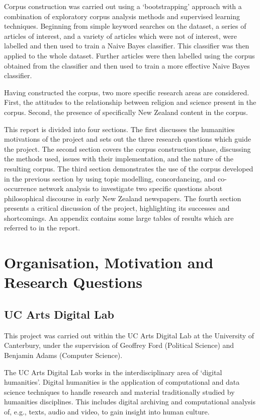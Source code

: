 \documentclass{article}
\begin{document}
Corpus construction was carried out using a `bootstrapping' approach with a combination of exploratory corpus analysis methods and supervised learning techniques. Beginning from simple keyword searches on the dataset, a series of articles of interest, and a variety of articles which were not of interest, were labelled and then used to train a Naive Bayes classifier. This classifier was then applied to the whole dataset. Further articles were then labelled using the corpus obtained from the classifier and then used to train a more effective Naive Bayes classifier.

Having constructed the corpus, two more specific research areas are considered. First, the attitudes to the relationship between religion and science present in the corpus. Second, the presence of specifically New Zealand content in the corpus.

This report is divided into four sections. The first discusses the humanities motivations of the project and sets out the three research questions which guide the project. The second section covers the corpus construction phase, discussing the methods used, issues with their implementation, and the nature of the resulting corpus. The third section demonstrates the use of the corpus developed in the previous section by using topic modelling, concordancing, and co-occurrence network analysis to investigate two specific questions about philosophical discourse in early New Zealand newspapers. The fourth section presents a critical discussion of the project, highlighting its successes and shortcomings. An appendix contains some large tables of results which are referred to in the report.

\section{Organisation, Motivation and Research Questions}

\subsection{UC Arts Digital Lab}

This project was carried out within the UC Arts Digital Lab at the University of Canterbury, under the supervision of Geoffrey Ford (Political Science) and Benjamin Adams (Computer Science).

The UC Arts Digital Lab works in the interdisciplinary area of `digital humanities'. Digital humanities is the application of computational and data science techniques to handle research and material traditionally studied by humanities disciplines. This includes digital archiving and computational analysis of, e.g., texts, audio and video, to gain insight into human culture.
\end{document}
